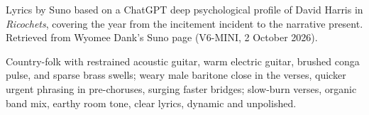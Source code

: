 
\begin{notes}
Lyrics by Suno based on a ChatGPT deep psychological profile of David Harris in \emph{Ricochets}, covering the year from the incitement incident to the narrative present. Retrieved from Wyomee Dank’s Suno page (V6-MINI, 2 October 2026).
\end{notes}
\begin{style}
Country-folk with restrained acoustic guitar, warm electric guitar, brushed conga pulse, and sparse brass swells; weary male baritone close in the verses, quicker urgent phrasing in pre-choruses, surging faster bridges; slow-burn verses, organic band mix, earthy room tone, clear lyrics, dynamic and unpolished.
\end{style}
